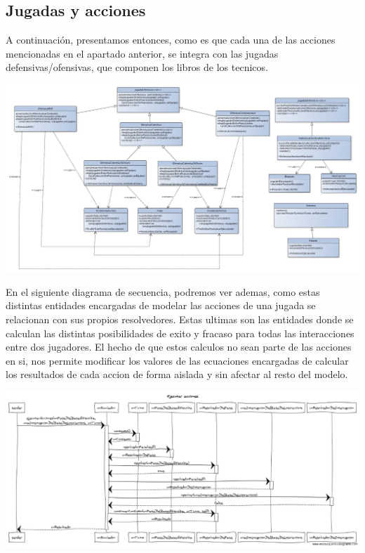 \subsection{Jugadas y acciones}
A continuación, presentamos entonces, como es que cada una de las acciones mencionadas en el apartado anterior, se integra con las jugadas defensivas/ofensivas, que componen los libros de los tecnicos.
\begin{center}
\includegraphics[scale=0.4, angle=90]{diseno/jugadasYAcciones.jpg}
\end{center}

En el siguiente diagrama de secuencia, podremos ver ademas, como estas distintas entidades encargadas de modelar las acciones de una jugada se relacionan con sus propios resolvedores. Estas ultimas son las entidades donde se calculan las distintas posibilidades de exito y fracaso para todas las interacciones entre dos jugadores. El hecho de que estos calculos no sean parte de las acciones en si, nos permite modificar los valores de las ecuaciones encargadas de calcular los resultados de cada accion de forma aislada y sin afectar al resto del modelo.

\begin{center}
\includegraphics[scale=0.4, angle=90]{diseno/Ejecutar_acciones.png}
\end{center}


